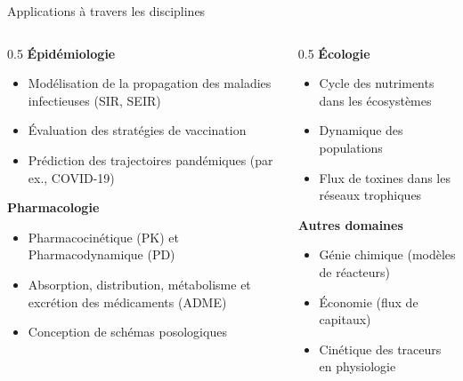 \documentclass[aspectratio=169]{beamer}\usepackage[]{graphicx}\usepackage[]{xcolor}
\begin{document}
\begin{frame}{Applications à travers les disciplines}
    \begin{columns}[t]
        \begin{column}{0.5\textwidth}
            \textbf{Épidémiologie}
            \begin{itemize}
                \item Modélisation de la propagation des maladies infectieuses (SIR, SEIR)
                \item Évaluation des stratégies de vaccination
                \item Prédiction des trajectoires pandémiques (par ex., COVID-19)
            \end{itemize}
            \vfill
            \textbf{Pharmacologie}
            \begin{itemize}
                \item Pharmacocinétique (PK) et Pharmacodynamique (PD)
                \item Absorption, distribution, métabolisme et excrétion des médicaments (ADME)
                \item Conception de schémas posologiques
            \end{itemize}
        \end{column}
        \begin{column}{0.5\textwidth}
            \textbf{Écologie}
            \begin{itemize}
                \item Cycle des nutriments dans les écosystèmes
                \item Dynamique des populations
                \item Flux de toxines dans les réseaux trophiques
            \end{itemize}
            \vfill
            \textbf{Autres domaines}
            \begin{itemize}
                \item Génie chimique (modèles de réacteurs)
                \item Économie (flux de capitaux)
                \item Cinétique des traceurs en physiologie
            \end{itemize}
        \end{column}
    \end{columns}
\end{frame}


\end{document}
